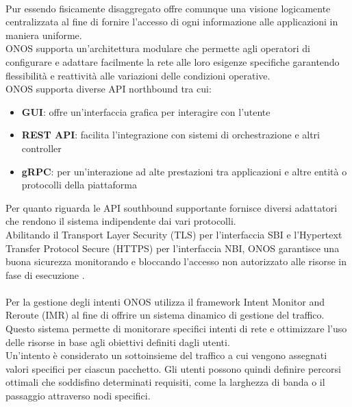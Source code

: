 \\Pur essendo fisicamente disaggregato offre comunque una visione logicamente centralizzata al fine di fornire l'accesso di ogni informazione alle applicazioni in maniera uniforme.
\\ONOS supporta un'architettura modulare che permette agli operatori di configurare e adattare facilmente la rete alle loro esigenze specifiche
garantendo flessibilità e reattività alle variazioni delle condizioni operative.
\\ONOS supporta diverse API northbound tra cui:
\begin{itemize}
\item \textbf{GUI}: offre un'interfaccia grafica per interagire con l'utente
\item \textbf{REST API}: facilita l'integrazione con sistemi di orchestrazione e altri controller 
\item \textbf{gRPC}: per un'interazione ad alte prestazioni tra applicazioni e altre entità o protocolli della piattaforma
\end{itemize}
Per quanto riguarda le API southbound supportante fornisce diversi adattatori che rendono il sistema indipendente dai vari protocolli.
\\Abilitando il Transport Layer Security (TLS) per l'interfaccia SBI e l'Hypertext Transfer Protocol Secure (HTTPS) per l'interfaccia NBI, 
ONOS garantisce una buona sicurezza monitorando e bloccando l'accesso non autorizzato alle risorse in fase di esecuzione \cite{artONOS}.
\\
\\Per la gestione degli intenti ONOS utilizza il framework Intent Monitor and Reroute (IMR) al fine di offrire un sistema dinamico di gestione del traffico.
Questo sistema permette di monitorare specifici intenti di rete e ottimizzare l'uso delle risorse in base agli obiettivi definiti dagli utenti.
\\Un'intento è considerato un sottoinsieme del traffico a cui vengono assegnati valori specifici per ciascun pacchetto.
Gli utenti possono quindi definire percorsi ottimali che soddisfino determinati requisiti, come la larghezza di banda o il passaggio attraverso nodi specifici.
